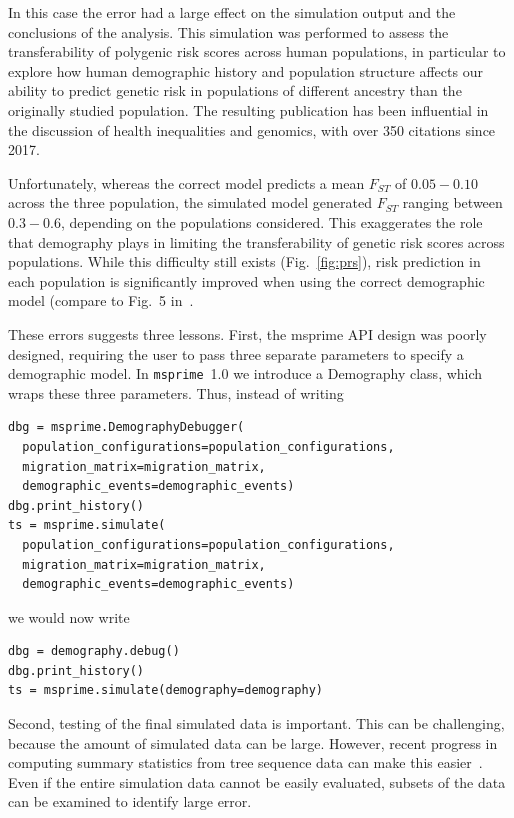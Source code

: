 \documentclass{article}
\newcommand{\msprime}[0]{\texttt{msprime}}
\begin{document}
In this case the error had a large effect on the simulation output and 
the conclusions of the analysis. This simulation was performed to assess the 
transferability of polygenic risk scores across human populations, in particular to
explore how human demographic history and population structure affects our ability
to predict genetic risk in populations of different ancestry than the originally studied
population. The resulting publication has been influential in the discussion of 
health inequalities and genomics, with over 350 citations since 2017. 

Unfortunately, whereas the correct model predicts a mean $F_{ST}$ of 
$0.05 - 0.10$ across the three population, the simulated model generated $F_{ST}$
ranging between $0.3 - 0.6$, depending on the populations considered.
This exaggerates the role that demography plays in limiting the transferability
of genetic risk scores across populations. While this difficulty still exists 
(Fig.~\ref{fig:prs}), risk prediction in each population is significantly improved 
when using the correct demographic model (compare to Fig.~5 in~\citet{martin2017human}.

These errors suggests three lessons. 
First, the msprime API design was poorly designed, requiring the user to pass 
three separate parameters to specify a demographic model. 
In \msprime\ 1.0 we introduce
a Demography class, which wraps these three parameters.
Thus, instead of writing
\begin{lstlisting}[frame=single]
dbg = msprime.DemographyDebugger(
  population_configurations=population_configurations,
  migration_matrix=migration_matrix,
  demographic_events=demographic_events)
dbg.print_history()
ts = msprime.simulate(
  population_configurations=population_configurations,
  migration_matrix=migration_matrix,
  demographic_events=demographic_events)
\end{lstlisting}
we would now write
\begin{lstlisting}[frame=single]
dbg = demography.debug()
dbg.print_history()
ts = msprime.simulate(demography=demography)
\end{lstlisting}

Second, testing of the final simulated data is important. This can be challenging, 
because the amount of simulated data can be large. However, recent progress in 
computing summary statistics from tree sequence data can make this easier~\cite{ralph2020efficiently}. 
Even if the entire simulation data cannot be easily evaluated, subsets of the data 
can be examined to identify large error.  
\end{document}
